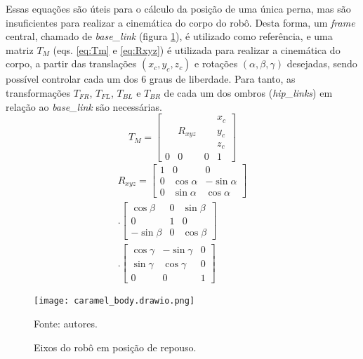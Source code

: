 \documentclass[conference]{IEEEtran}
\begin{document}
Essas equações são úteis para o cálculo da posição de uma única perna, mas são insuficientes para realizar a cinemática do corpo do robô. Desta forma, um \textit{frame} central, chamado de \textit{base\_link} (figura \ref{fig:caramel_body}), é utilizado como referência, e uma matriz $T_M$ (eqs. \ref{eq:Tm} e \ref{eq:Rxyz}) é utilizada para realizar a cinemática do corpo, a partir das translações $(x_c, y_c, z_c)$ e rotações $(\alpha, \beta, \gamma)$ desejadas, sendo possível controlar cada um dos 6 graus de liberdade. Para tanto, as transformações $T_{FR}$, $T_{FL}$, $T_{BL}$ e $T_{BR}$ de cada um dos ombros (\textit{hip\_links}) em relação ao \textit{base\_link} são necessárias.
\begin{equation}
  \label{eq:Tm}
  T_M =
  \begin{bmatrix}
      &         &   & x_c \\
      & R_{xyz} &   & y_c \\
      &         &   & z_c \\
    0 & 0       & 0 & 1
  \end{bmatrix}
\end{equation}
\begin{equation}
  \label{eq:Rxyz}
  \begin{split}
    R_{xyz} =
    \begin{bmatrix}
      1 & 0          & 0           \\
      0 & \cos\alpha & -\sin\alpha \\
      0 & \sin\alpha & \cos\alpha
    \end{bmatrix}
    \\.
    \begin{bmatrix}
      \cos\beta  & 0 & \sin\beta \\
      0          & 1 & 0         \\
      -\sin\beta & 0 & \cos\beta
    \end{bmatrix}
    \\.
    \begin{bmatrix}
      \cos\gamma & -\sin\gamma & 0 \\
      \sin\gamma & \cos\gamma  & 0 \\
      0          & 0           & 1
    \end{bmatrix}
  \end{split}
\end{equation}

\begin{figure}[htbp]
  \centering
  \vspace{-0.75cm}
  \texttt{[image: caramel\_body.drawio.png]}

  \caption{Eixos do robô em posição de repouso.}
  Fonte: autores.
  \label{fig:caramel_body}
\end{figure}
\end{document}
